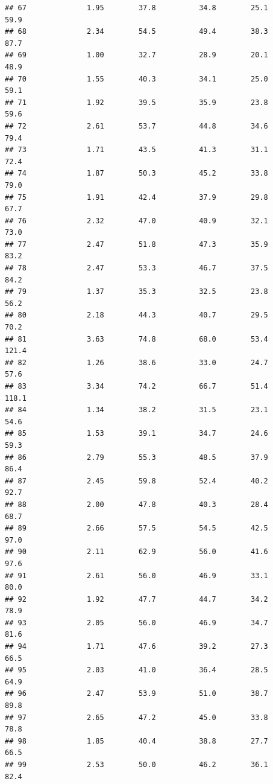 \documentclass[
]{book}
\theoremstyle{definition}
\theoremstyle{definition}
\theoremstyle{definition}
\theoremstyle{definition}
\theoremstyle{remark}
\begin{document}
\begin{verbatim}
## 67              1.95        37.8          34.8        25.1             59.9
## 68              2.34        54.5          49.4        38.3             87.7
## 69              1.00        32.7          28.9        20.1             48.9
## 70              1.55        40.3          34.1        25.0             59.1
## 71              1.92        39.5          35.9        23.8             59.6
## 72              2.61        53.7          44.8        34.6             79.4
## 73              1.71        43.5          41.3        31.1             72.4
## 74              1.87        50.3          45.2        33.8             79.0
## 75              1.91        42.4          37.9        29.8             67.7
## 76              2.32        47.0          40.9        32.1             73.0
## 77              2.47        51.8          47.3        35.9             83.2
## 78              2.47        53.3          46.7        37.5             84.2
## 79              1.37        35.3          32.5        23.8             56.2
## 80              2.18        44.3          40.7        29.5             70.2
## 81              3.63        74.8          68.0        53.4            121.4
## 82              1.26        38.6          33.0        24.7             57.6
## 83              3.34        74.2          66.7        51.4            118.1
## 84              1.34        38.2          31.5        23.1             54.6
## 85              1.53        39.1          34.7        24.6             59.3
## 86              2.79        55.3          48.5        37.9             86.4
## 87              2.45        59.8          52.4        40.2             92.7
## 88              2.00        47.8          40.3        28.4             68.7
## 89              2.66        57.5          54.5        42.5             97.0
## 90              2.11        62.9          56.0        41.6             97.6
## 91              2.61        56.0          46.9        33.1             80.0
## 92              1.92        47.7          44.7        34.2             78.9
## 93              2.05        56.0          46.9        34.7             81.6
## 94              1.71        47.6          39.2        27.3             66.5
## 95              2.03        41.0          36.4        28.5             64.9
## 96              2.47        53.9          51.0        38.7             89.8
## 97              2.65        47.2          45.0        33.8             78.8
## 98              1.85        40.4          38.8        27.7             66.5
## 99              2.53        50.0          46.2        36.1             82.4

\end{verbatim}
\end{document}
